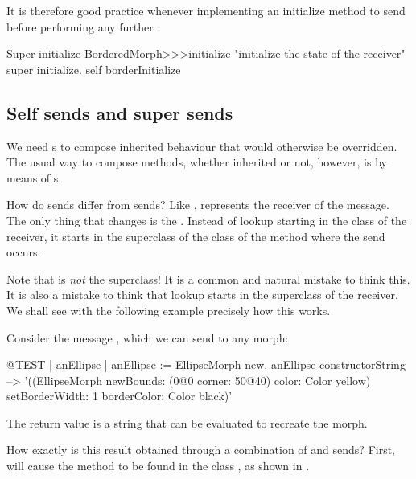 \documentclass[a4paper,10pt,twoside]{book}
\begin{document}
It is therefore good practice whenever implementing an initialize method to send  before performing any further :

\begin{method}[morphinit]{Super initialize}
BorderedMorph>>>initialize
	"initialize the state of the receiver"
	super initialize.
	self borderInitialize
\end{method}


\subsection{Self sends and super sends}

We need \super {}s to compose inherited behaviour that would otherwise be overridden.
The usual way to compose methods, whether inherited or not, however, is by means of \self {}s.

How do \self sends differ from \super sends?
Like \self, \super represents the receiver of the message.
The only thing that changes is the .
Instead of lookup starting in the class of the receiver, it starts in the superclass of the class of the method where the \super send occurs.

Note that \super is \emph{not} the superclass!
It is a common and natural mistake to think this.
It is also a mistake to think that lookup starts in the superclass of the receiver.
We shall see with the following example precisely how this works.

Consider the message , which we can send to any morph:
\begin{code}{@TEST | anEllipse | anEllipse := EllipseMorph new.}
anEllipse constructorString --> '((EllipseMorph newBounds: (0@0 corner: 50@40) color: Color yellow) setBorderWidth: 1 borderColor: Color black)'
\end{code}
The return value is a string that can be evaluated to recreate the morph.

How exactly is this result obtained through a combination of \self and \super sends?
First,  will cause the method  to be found in the class ,
as shown in .
\end{document}
